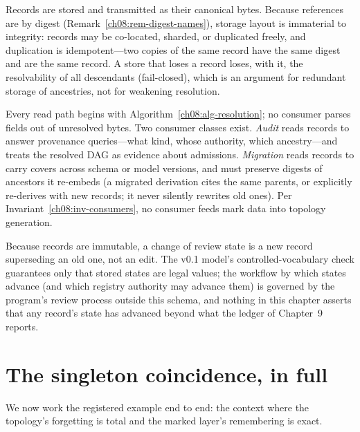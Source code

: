 \begin{protocol}\label{ch08:proto-storage}
Records are stored and transmitted as their canonical bytes. Because references are by digest (Remark~\ref{ch08:rem-digest-names}), storage layout is immaterial to integrity: records may be co-located, sharded, or duplicated freely, and duplication is idempotent---two copies of the same record have the same digest and are the same record. A store that loses a record loses, with it, the resolvability of all descendants (fail-closed), which is an argument for redundant storage of ancestries, not for weakening resolution.
\end{protocol}

\begin{protocol}[Consumption]\label{ch08:proto-consumption}
Every read path begins with Algorithm~\ref{ch08:alg-resolution}; no consumer parses fields out of unresolved bytes. Two consumer classes exist. \emph{Audit} reads records to answer provenance queries---what kind, whose authority, which ancestry---and treats the resolved DAG as evidence about admissions. \emph{Migration} reads records to carry covers across schema or model versions, and must preserve digests of ancestors it re-embeds (a migrated derivation cites the same parents, or explicitly re-derives with new records; it never silently rewrites old ones). Per Invariant~\ref{ch08:inv-consumers}, no consumer feeds mark data into topology generation.
\end{protocol}

\begin{protocol}\label{ch08:proto-review}
Because records are immutable, a change of review state is a new record superseding an old one, not an edit. The v0.1 model's controlled-vocabulary check guarantees only that stored states are legal values; the workflow by which states advance (and which registry authority may advance them) is governed by the program's review process outside this schema, and nothing in this chapter asserts that any record's state has advanced beyond what the ledger of Chapter~9 reports.
\end{protocol}

\section{The singleton coincidence, in full}\label{ch08:sec-singleton}

We now work the registered example end to end: the context where the topology's forgetting is total and the marked layer's remembering is exact.

